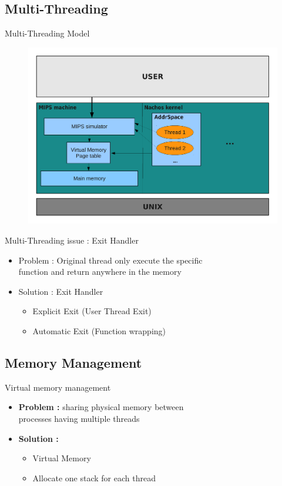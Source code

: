 \documentclass{beamer}
\begin{document}
\subsection{Multi-Threading}
\begin{frame}{Multi-Threading Model}
    \begin{figure}[ht]
        \includegraphics[width=0.8\linewidth]{threadschema.pdf}
    \end{figure}
\end{frame}

\begin{frame}{Multi-Threading issue : Exit Handler}
    \begin{itemize}
        \item Problem : Original thread only execute the specific 
            \\function and return anywhere in the memory 
        \item Solution : Exit Handler
            \begin{itemize}
                \item Explicit Exit (User Thread Exit)
                \item Automatic Exit (Function wrapping)
            \end{itemize}
    \end{itemize}
\end{frame}

\subsection{Memory Management}
\begin{frame}{Virtual memory management}
    \begin{itemize}
        \item \textbf{Problem :} sharing physical memory between 
            \\processes having multiple threads
        \item \textbf{Solution :}
            \begin{itemize}
                \item Virtual Memory 
                \item Allocate one stack for each thread
            \end{itemize}
    \end{itemize}
\end{frame}
\end{document}
